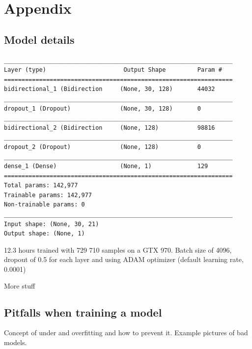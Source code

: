 
\newpage

\section{Appendix}

\subsection{Model details}

\begin{lstlisting}
_________________________________________________________________
Layer (type)                      Output Shape         Param #   
=================================================================
bidirectional_1 (Bidirection     (None, 30, 128)       44032     
_________________________________________________________________
dropout_1 (Dropout)              (None, 30, 128)       0         
_________________________________________________________________
bidirectional_2 (Bidirection     (None, 128)           98816     
_________________________________________________________________
dropout_2 (Dropout)              (None, 128)           0         
_________________________________________________________________
dense_1 (Dense)                  (None, 1)             129       
=================================================================
Total params: 142,977
Trainable params: 142,977
Non-trainable params: 0
_________________________________________________________________
Input shape: (None, 30, 21)
Output shape: (None, 1)

\end{lstlisting}

12.3 hours trained with 729 710 samples on a GTX 970.
Batch size of 4096, dropout of 0.5 for each layer and using ADAM optimizer (default learning rate, 0.0001)

More stuff
\newline  %


\subsection{Pitfalls when training a model}
Concept of under and overfitting and how to prevent it. Example pictures of bad models.

